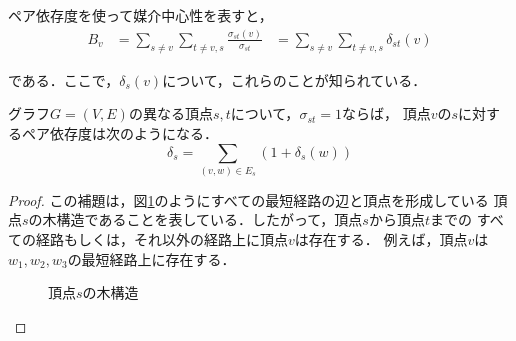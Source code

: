 ペア依存度を使って媒介中心性を表すと，
\begin{equation*}
  \begin{aligned}
    B_v&=\sum_{s\neq v}\sum_{t\neq v,s}\frac{\sigma_{st}(v)}{\sigma_{st}}
    &=\sum_{s\neq v}\sum_{t\neq v,s}\delta_{st}(v)
  \end{aligned}
\end{equation*}

である．ここで，$\delta_{s}(v)$について，これらのことが知られている．

\begin{lemma}
  \label{lemma:implicit-pd-part}
  グラフ$G=(V,E)$の異なる頂点$s,t$について，$\sigma_{st}=1$ならば，
  頂点$v$の$s$に対するペア依存度は次のようになる．
  \begin{equation}
    \label{eq:implicit-pd-part}
    \delta_{s}=\sum_{(v,w)\in E_s}(1+\delta_{s}(w))
  \end{equation}
\end{lemma}
\begin{proof}
  この補題は，図\ref{fig:implicit-pd-1}のようにすべての最短経路の辺と頂点を形成している
  頂点$s$の木構造であることを表している．したがって，頂点$s$から頂点$t$までの
  すべての経路もしくは，それ以外の経路上に頂点$v$は存在する．
  例えば，頂点$v$は$w_1,w_2,w_3$の最短経路上に存在する．

  \begin{figure}[tb]
    \centering
    \def\svgwidth{.35\linewidth}
    
    \caption{頂点$s$の木構造}
    \label{fig:implicit-pd-1}
  \end{figure}
\end{proof}

